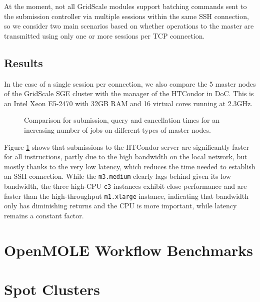 At the moment, not all GridScale modules support batching commands sent to the submission controller via multiple sessions within the same SSH connection, so we consider two main scenarios based on whether operations to the master are transmitted using only one or more sessions per TCP connection.

\subsection{Results}

In the case of a single session per connection, we also compare the 5 master nodes of the GridScale SGE cluster with the manager of the HTCondor in DoC. This is an Intel Xeon E5-2470 with 32GB RAM and 16 virtual cores running at 2.3GHz. 

\begin{figure}[H]
	\centering
	\endminipage \vfill
	\endminipage \hfill
	\endminipage \hfill
	\caption{Comparison for submission, query and cancellation times for an increasing number of jobs on different types of master nodes.}
	\label{SingleSession}
\end{figure}

Figure \ref{SingleSession} shows that submissions to the HTCondor server are significantly faster for all instructions, partly due to the high bandwidth on the local network, but mostly thanks to the very low latency, which reduces the time needed to establish an SSH connection. While the \verb|m3.medium| clearly lags behind given its low bandwidth, the three high-CPU \verb|c3| instances exhibit close performance and are faster than the high-throughput \verb|m1.xlarge| instance, indicating that bandwidth only has diminishing returns and the CPU is more important, while latency remains a constant factor.


\section{OpenMOLE Workflow Benchmarks}



\section{Spot Clusters}

